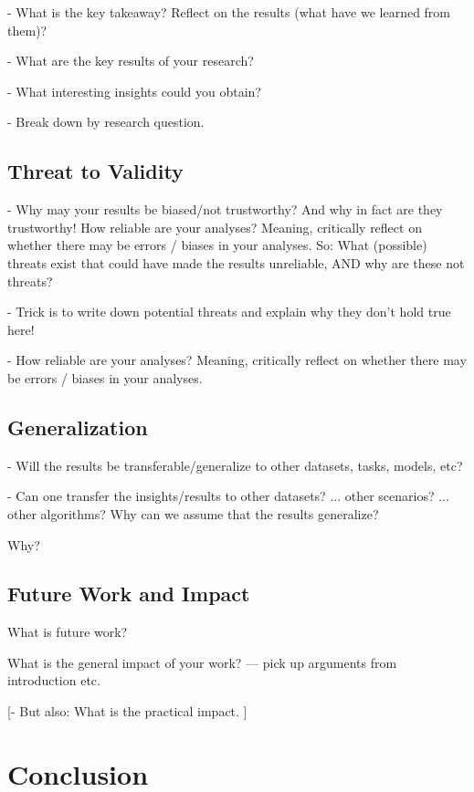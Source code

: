 \documentclass[sigconf, nonacm]{acmart}
\begin{document}
- What is the key takeaway? Reflect on the results (what have we learned from them)?

- What are the key results of your research?

- What interesting insights could you obtain?

- Break down by research question.

\subsection{Threat to Validity}
\label{sec:threattovalidity}

- Why may your results be biased/not trustworthy? And why in fact are they trustworthy! How reliable are your analyses? Meaning, critically reflect on whether there may be errors / biases in your analyses. So: What (possible) threats exist that could have made the results unreliable, AND why are these not threats?

- Trick is to write down potential threats and explain why they don't hold true here!

- How reliable are your analyses? Meaning, critically reflect on whether there may be errors / biases in your analyses.

\subsection{Generalization}
\label{sec:generalization}

- Will the results be transferable/generalize to other datasets, tasks, models, etc?

- Can one transfer the insights/results to other datasets? ... other scenarios? ... other algorithms? Why can we assume that the results generalize?

Why?

\subsection{Future Work and Impact}
\label{sec:futurework}

What is future work?

What is the general impact of your work?
--- pick up arguments from introduction etc.

[- But also: What is the practical impact. ]



\section{Conclusion}
\label{sec:conclusion}
\end{document}

